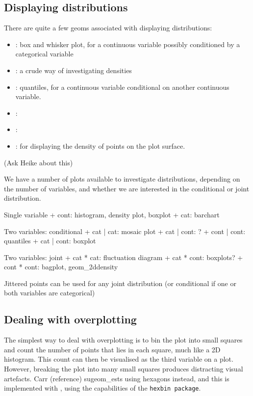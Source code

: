 \subsection{Displaying distributions}\label{sec:distributions}

There are quite a few geoms associated with displaying distributions:

\begin{itemize}
	\item {}: box and whisker plot, for a continuous variable possibly conditioned by a categorical variable
	\item {}: a crude way of investigating densities
	\item {}: quantiles, for a continuous variable conditional on another continuous variable.
	\item {}: 
	\item {}: 
	\item {}: for displaying the density of points on the plot surface.
\end{itemize}

(Ask Heike about this)

We have a number of plots available to investigate distributions, depending on the number of variables, and whether we are interested in the conditional or joint distribution.

Single variable
+ cont: histogram, density plot, boxplot
+ cat:  barchart

Two variables: conditional
+ cat  | cat:  mosaic plot
+ cat  | cont: ?
+ cont | cont: quantiles
+ cat  | cont: boxplot

Two variables: joint
+ cat  * cat:  fluctuation diagram
+ cat  * cont: boxplots?
+ cont * cont: bagplot, geom_2ddensity

Jittered points can be used for any joint distribution (or conditional if one or both variables are categorical)

\subsection{Dealing with overplotting}\label{sec:overplotting}

The simplest way to deal with overplotting is to bin the plot into small squares and count the number of points that lies in each square, much like a 2D histogram.  This count can then be visualised as the third variable on a plot.  However, breaking the plot into many small squares produces distracting visual artefacts.  Carr (reference) sugeom_ests using hexagons instead, and this is implemented with , using the capabilities of the {\tt hexbin package}.

